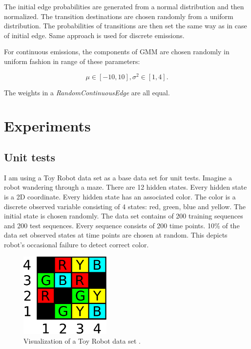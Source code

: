 \documentclass[thesis=B,english]{FITthesis}[2012/06/26]
\begin{document}
The initial edge probabilities are generated from a normal distribution and then normalized. The transition destinations are chosen randomly from a uniform distribution. The probabilities of transitions are then set the same way as in case of initial edge. Same approach is used for discrete emissions.

For continuous emissions, the components of GMM are chosen randomly in uniform fashion in range of these parameters:

\begin{equation*}
\mu \in [-10,10],
\sigma^2 \in [1,4].
\end{equation*}

\medskip

The weights in a \textit{RandomContinuousEdge} are all equal.

\chapter{Experiments}

\section{Unit tests}

I am using a Toy Robot data set \cite{robot-maze} as a base data set for unit tests. Imagine a robot wandering through a maze. There are 12 hidden states. Every hidden state is a 2D coordinate. Every hidden state has an associated color. The color is a discrete observed variable consisting of 4 states: red, green, blue and yellow. The initial state is chosen randomly. The data set contains of 200 training sequences and 200 test sequences. Every sequence consists of 200 time points. 10\% of the data set observed states at time points are chosen at random. This depicts robot's occasional failure to detect correct color.

\begin{figure}
	\centering
 	\includegraphics[width=0.4\textwidth]{robot_maze}
 	\caption{Visualization of a Toy Robot data set \cite{robot-maze}.}
 	\label{fig:robot_maze}
\end{figure}
\end{document}
